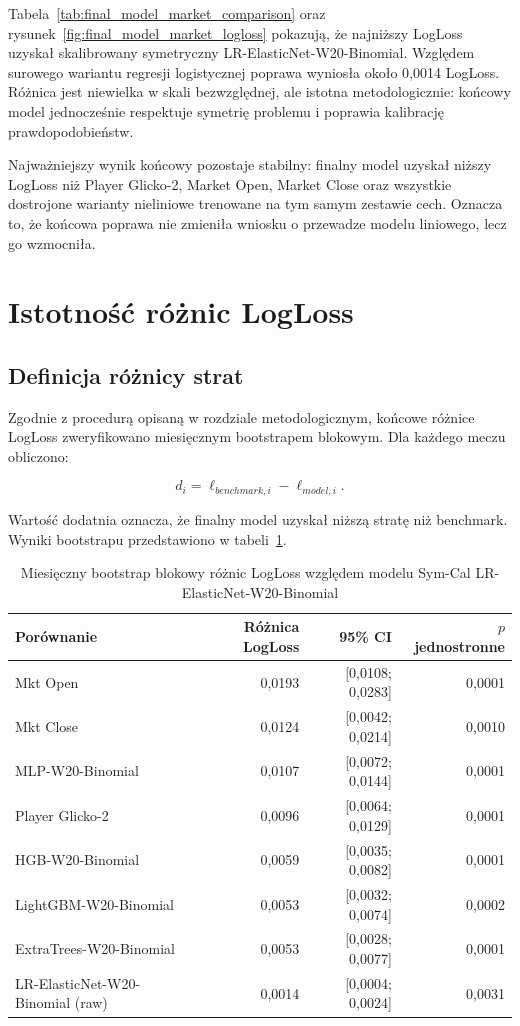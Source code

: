 Tabela~\ref{tab:final_model_market_comparison} oraz rysunek~\ref{fig:final_model_market_logloss}
pokazują, że najniższy LogLoss uzyskał skalibrowany symetryczny LR-ElasticNet-W20-Binomial. Względem
surowego wariantu regresji logistycznej poprawa wyniosła około 0{,}0014 LogLoss. Różnica jest
niewielka w skali bezwzględnej, ale istotna metodologicznie: końcowy model jednocześnie respektuje
symetrię problemu i poprawia kalibrację prawdopodobieństw.

Najważniejszy wynik końcowy pozostaje stabilny: finalny model uzyskał niższy LogLoss niż Player
Glicko-2, Market Open, Market Close oraz wszystkie dostrojone warianty nieliniowe trenowane na tym
samym zestawie cech. Oznacza to, że końcowa poprawa nie zmieniła wniosku o przewadze modelu
liniowego, lecz go wzmocniła.

\section{Istotność różnic LogLoss}

\subsection{Definicja różnicy strat}

Zgodnie z procedurą opisaną w rozdziale metodologicznym, końcowe różnice LogLoss zweryfikowano
miesięcznym bootstrapem blokowym. Dla każdego meczu obliczono:

\[ d_i = \ell_{benchmark,i} - \ell_{model,i}. \]

Wartość dodatnia oznacza, że finalny model uzyskał niższą stratę niż benchmark. Wyniki bootstrapu
przedstawiono w tabeli~\ref{tab:logloss_block_bootstrap}.

\begin{table}[H]
    \centering
    \caption{Miesięczny bootstrap blokowy różnic LogLoss względem modelu Sym-Cal LR-ElasticNet-W20-Binomial}
    \label{tab:logloss_block_bootstrap}
    \small
    \begin{tabular}{p{5.7cm}rrr}
        \toprule
        Porównanie & Różnica LogLoss & 95\% CI & $p$ jednostronne \\
        \midrule
        Mkt Open & 0{,}0193 & [0{,}0108; 0{,}0283] & 0{,}0001 \\
        Mkt Close & 0{,}0124 & [0{,}0042; 0{,}0214] & 0{,}0010 \\
        MLP-W20-Binomial & 0{,}0107 & [0{,}0072; 0{,}0144] & 0{,}0001 \\
        Player Glicko-2 & 0{,}0096 & [0{,}0064; 0{,}0129] & 0{,}0001 \\
        HGB-W20-Binomial & 0{,}0059 & [0{,}0035; 0{,}0082] & 0{,}0001 \\
        LightGBM-W20-Binomial & 0{,}0053 & [0{,}0032; 0{,}0074] & 0{,}0002 \\
        ExtraTrees-W20-Binomial & 0{,}0053 & [0{,}0028; 0{,}0077] & 0{,}0001 \\
        LR-ElasticNet-W20-Binomial (raw) & 0{,}0014 & [0{,}0004; 0{,}0024] & 0{,}0031 \\
        \bottomrule
    \end{tabular}
\end{table}


